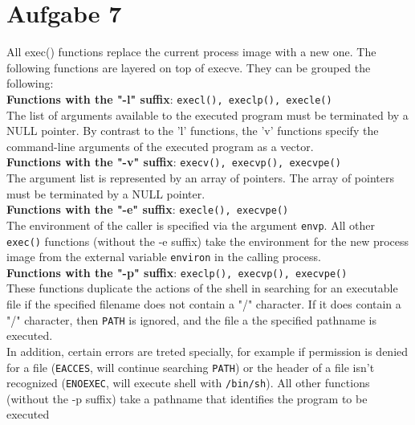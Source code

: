 \documentclass{article}
\begin{document}
\section*{Aufgabe 7}
All exec() functions replace the current process image with a new one.
The following functions are layered on top of execve.
They can be grouped the following:\\

\textbf{Functions with the "-l" suffix}: \texttt{execl(), execlp(), execle()}\\
The list of arguments available to the executed program must be terminated by
a NULL pointer. By contrast to the 'l' functions, the 'v' functions specify
the command-line arguments of the executed program as a vector.\\
\textbf{Functions with the "-v" suffix}: \texttt{execv(), execvp(), execvpe()}\\
The argument list is represented by an array of pointers. The array of pointers
must be terminated by a NULL pointer.\\
\textbf{Functions with the "-e" suffix}: \texttt{execle(), execvpe()}\\
The environment of the caller is specified via the argument \texttt{envp}.
All other \texttt{exec()} functions (without the -e suffix) take the
environment for the new process image from the external variable
\texttt{environ} in the calling process.\\
\textbf{Functions with the "-p" suffix}: \texttt{execlp(), execvp(), execvpe()}\\
These functions duplicate the actions of the shell in searching for an
executable file if the specified filename does not contain a "/" character.
If it does contain a "/" character, then \texttt{PATH} is ignored, and
the file a the specified pathname is executed.\\
In addition, certain errors are treted specially, for example if permission
is denied for a file (\texttt{EACCES}, will continue searching \texttt{PATH})
or the header of a file isn't
recognized (\texttt{ENOEXEC}, will execute shell with \texttt{/bin/sh}).
All other functions (without the -p suffix) 
take a pathname that identifies the program to be executed
\end{document}
